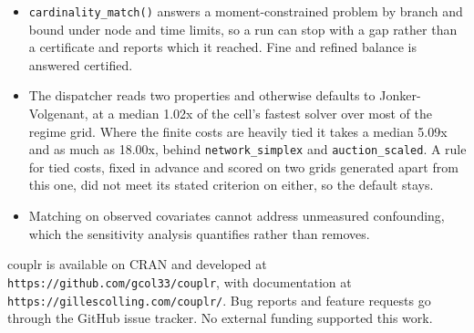 \begin{itemize}
\tightlist
\item
  \texttt{cardinality\_match()} answers a moment-constrained problem by branch and
  bound under node and time limits, so a run can stop with a gap rather than a
  certificate and reports which it reached. Fine and refined balance is
  answered certified.
\item
  The dispatcher reads two properties and otherwise defaults to
  Jonker-Volgenant, at a median 1.02x of the cell's
  fastest solver over most of the regime grid. Where the finite costs are
  heavily tied it takes a median 5.09x and as much as
  18.00x, behind \texttt{network\_simplex} and
  \texttt{auction\_scaled}. A rule for tied costs, fixed in advance and
  scored on two grids generated apart from this one, did not meet its stated
  criterion on either, so the default stays.
\item
  Matching on observed covariates cannot address unmeasured confounding, which
  the sensitivity analysis quantifies rather than removes.
\end{itemize}

couplr is available on CRAN and developed at
\texttt{https://github.com/gcol33/couplr}, with documentation at
\texttt{https://gillescolling.com/couplr/}. Bug reports and feature requests go
through the GitHub issue tracker. No external funding supported this work.



\address{%
Gilles Colling\\
University of Vienna\\%
Department of Botany and Biodiversity Research\\ Rennweg 14, 1030 Vienna, Austria\\
%
\url{https://gillescolling.com}\\%
\textit{ORCID: \href{https://orcid.org/0000-0003-3070-6066}{0000-0003-3070-6066}}\\%
\href{mailto:gilles.colling051@gmail.com}{\nolinkurl{gilles.colling051@gmail.com}}%
}
